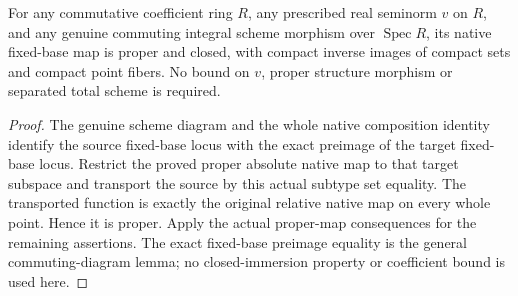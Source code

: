 \begin{theorem}
\label{scheme:relative-integral-native-proper-map}
\leanok
{}
For any commutative coefficient ring $R$, any prescribed real seminorm
$v$ on $R$, and any genuine commuting integral scheme morphism over
$\operatorname{Spec}R$, its native fixed-base map is proper and closed,
with compact inverse images of compact sets and compact point fibers.
No bound on $v$, proper structure morphism or separated total scheme
is required.
\end{theorem}
\begin{proof}
The genuine scheme diagram and the whole native composition identity
identify the source fixed-base locus with the exact preimage of the
target fixed-base locus. Restrict the proved proper absolute native map
to that target subspace and transport the source by this actual subtype
set equality. The transported function is exactly the original relative
native map on every whole point. Hence it is proper. Apply the actual
proper-map consequences for the remaining assertions. The exact
fixed-base preimage equality is the general commuting-diagram lemma;
no closed-immersion property or coefficient bound is used here.
\end{proof}

